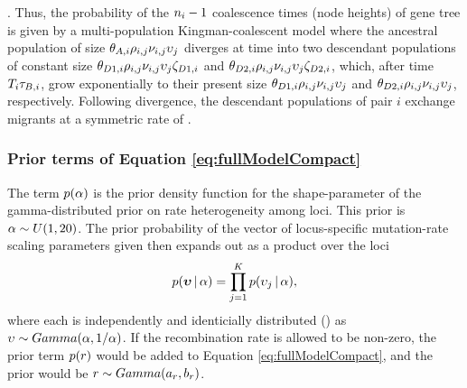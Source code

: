 \documentclass[letterpaper,12pt]{article}
\begin{document}
\begin{linenumbers}
\begin{linenomath}
\migrationRate{}.
Thus, the probability of the $\popSampleSize{i}{}-1$ coalescence times (node
heights) of gene tree  is given by a multi-population
Kingman-coalescent model \citep{Kingman1982} where the ancestral population of
size
$\ancestralTheta{i}\ploidyScalar{i}{j}\mutationRateScalarConstant{i}{j}\locusMutationRateScalar{j}$
diverges at time  into two descendant populations of constant
size
$\descendantTheta{1}{i}\ploidyScalar{i}{j}\mutationRateScalarConstant{i}{j}\locusMutationRateScalar{j}\bottleScalar{1}{i}$
and
$\descendantTheta{2}{i}\ploidyScalar{i}{j}\mutationRateScalarConstant{i}{j}\locusMutationRateScalar{j}\bottleScalar{2}{i}$,
which, after time $\divTimeMap{i}\bottleTime{i}$, grow exponentially to their
present size 
$\descendantTheta{1}{i}\ploidyScalar{i}{j}\mutationRateScalarConstant{i}{j}\locusMutationRateScalar{j}$
and
$\descendantTheta{2}{i}\ploidyScalar{i}{j}\mutationRateScalarConstant{i}{j}\locusMutationRateScalar{j}$,
respectively.
Following divergence, the descendant populations of pair $i$ exchange migrants at a symmetric rate of
.
\end{linenomath}


\subsubsection*{Prior terms of Equation \ref{eq:fullModelCompact}}
\begin{linenomath}
The term $p(\alpha)$ is the prior density
function for the shape-parameter of the gamma-distributed prior on
rate heterogeneity among loci.
This prior is $\alpha \sim U(1, 20)$.
The prior probability of the vector of locus-specific mutation-rate scaling parameters
given \locusRateHetShapeParameter then expands out as a product over
the loci
\begin{equation}
    p(\boldsymbol{\upsilon} \,|\, \alpha) =
    \prod_{j=1}^{K}
    p(\upsilon_{j} \,|\, \alpha),
    \label{eq:locusRateHetPrior}
\end{equation}
where each \locusMutationRateScalar{} is independently and identicially
distributed (\iid) as
$\upsilon_{} \sim Gamma(\alpha,
1/\alpha)$.
If the recombination rate \recombinationRate is allowed to be
non-zero, the prior term $p(r)$ would be added
to Equation \ref{eq:fullModelCompact}, and the prior would be
$r \sim Gamma(a_{r},
b_{r})$.
\end{linenomath}


\end{linenumbers}
\end{document}
